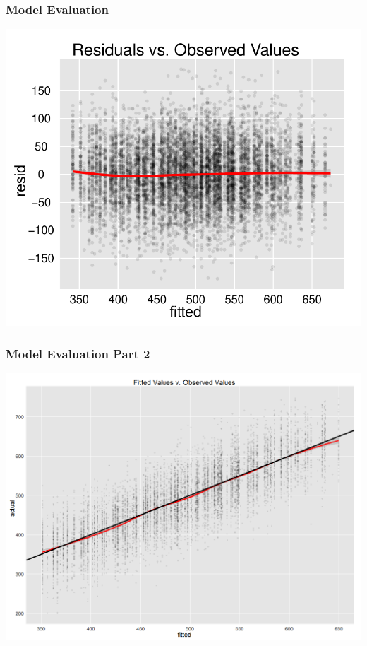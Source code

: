 \documentclass[12pt,handout]{beamer}
\begin{document}
\begin{frame}
\frametitle{Model Evaluation}
\begin{center}
\vspace{-.1in}
\includegraphics[width=.8\textwidth]{residplot}
\end{center}
\end{frame}

\begin{frame}
\frametitle{Model Evaluation Part 2}
\vspace{-.1in}
\begin{center}
\includegraphics[width=.8\textwidth]{fittedplot}
\end{center}
\end{frame}
\end{document}
